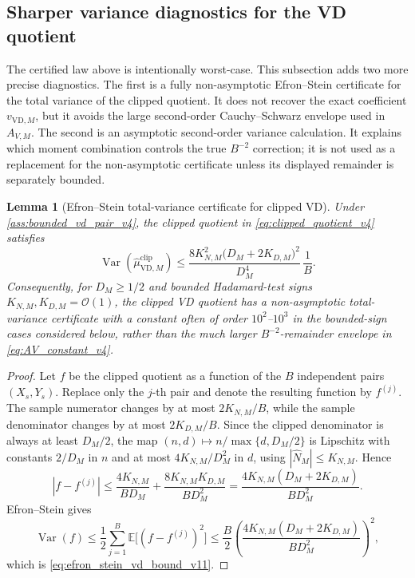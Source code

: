 \documentclass[11pt]{article}
\newtheorem{lemma}{Lemma}
\newcommand{\Var}{\operatorname{Var}}
\newcommand{\E}{\mathbb{E}}
\newcommand{\1}{\mathbf{1}}
\newcommand{\OO}{\mathcal{O}}
\newcommand{\abs}[1]{\left\lvert #1 \right\rvert}
\begin{document}
\subsection{Sharper variance diagnostics for the VD quotient}
\label{subsec:vd_sharper_variance_v11}

The certified law above is intentionally worst-case.  This subsection adds two more precise diagnostics.  The first is a fully non-asymptotic Efron--Stein certificate for the total variance of the clipped quotient.  It does not recover the exact coefficient \(v_{\mathrm{VD},M}\), but it avoids the large second-order Cauchy--Schwarz envelope used in \(A_{V,M}\).  The second is an asymptotic second-order variance calculation.  It explains which moment combination controls the true \(B^{-2}\) correction; it is not used as a replacement for the non-asymptotic certificate unless its displayed remainder is separately bounded.

\begin{lemma}[Efron--Stein total-variance certificate for clipped VD]
\label{lem:efron_stein_vd_v11}
Under \cref{ass:bounded_vd_pair_v4}, the clipped quotient in \cref{eq:clipped_quotient_v4} satisfies
\begin{equation}
    \Var\!\left(\widehat\mu_{\mathrm{VD},M}^{\mathrm{clip}}\right)
    \le
    \frac{8K_{N,M}^2\bigl(D_M+2K_{D,M}\bigr)^2}{D_M^4}\,\frac1B.
    \label{eq:efron_stein_vd_bound_v11}
\end{equation}
Consequently, for \(D_M\ge1/2\) and bounded Hadamard-test signs \(K_{N,M},K_{D,M}=\OO(1)\), the clipped VD quotient has a non-asymptotic total-variance certificate with a constant often of order \(10^2\)--\(10^3\) in the bounded-sign cases considered below, rather than the much larger \(B^{-2}\)-remainder envelope in \cref{eq:AV_constant_v4}.
\end{lemma}

\begin{proof}
Let \(f\) be the clipped quotient as a function of the \(B\) independent pairs \((X_s,Y_s)\).  Replace only the \(j\)-th pair and denote the resulting function by \(f^{(j)}\).  The sample numerator changes by at most \(2K_{N,M}/B\), while the sample denominator changes by at most \(2K_{D,M}/B\).  Since the clipped denominator is always at least \(D_M/2\), the map \((n,d)\mapsto n/\max\{d,D_M/2\}\) is Lipschitz with constants \(2/D_M\) in \(n\) and at most \(4K_{N,M}/D_M^2\) in \(d\), using \(\abs{\widehat N_M}\le K_{N,M}\).  Hence
\begin{equation}
    \abs{f-f^{(j)}}
    \le
    \frac{4K_{N,M}}{BD_M}
    +\frac{8K_{N,M}K_{D,M}}{BD_M^2}
    =
    \frac{4K_{N,M}(D_M+2K_{D,M})}{BD_M^2}.
\end{equation}
Efron--Stein gives
\begin{equation}
    \Var(f)\le \frac12\sum_{j=1}^B \E\big[(f-f^{(j)})^2\big]
    \le \frac{B}{2}\left(\frac{4K_{N,M}(D_M+2K_{D,M})}{BD_M^2}\right)^2,
\end{equation}
which is \cref{eq:efron_stein_vd_bound_v11}.
\end{proof}
\end{document}
